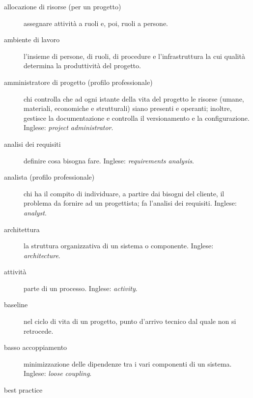 \documentclass[a4paper]{article}
\begin{document}
		
	\begin{description}
		
			
	\item[allocazione di risorse (per un progetto)] 

			assegnare attività a ruoli e, poi, ruoli a persone.
			
	\item[ambiente di lavoro] 

			l'insieme di persone, di ruoli, di procedure e l'infrastruttura la cui qualità determina la produttività del progetto.
			
	\item[amministratore di progetto (profilo professionale)] 

			chi controlla che ad ogni istante della vita del progetto le risorse (umane, materiali, economiche e strutturali) siano presenti e operanti; inoltre, gestisce la documentazione e controlla il versionamento e la configurazione. Inglese: \emph{project administrator}.
			
	\item[analisi dei requisiti] 

			definire cosa bisogna fare. Inglese: \emph{requirements analysis}.
			
	\item[analista (profilo professionale)] 

			chi ha il compito di individuare, a partire dai bisogni del cliente, il problema da fornire ad un progettista; fa l'analisi dei requisiti. Inglese: \emph{analyst}.
			
	\item[architettura] 

			la struttura organizzativa di un sistema o componente. Inglese: \emph{architecture}.
			
	\item[attività] 

			parte di un processo. Inglese: \emph{activity}.
			
	\item[baseline] 

			nel ciclo di vita di un progetto, punto d'arrivo tecnico dal quale non si retrocede.
			
	\item[basso accoppiamento] 

			minimizzazione delle dipendenze tra i vari componenti di un sistema. Inglese: \emph{loose coupling}.
			
	\item[best practice] 


\end{description}
\end{document}

